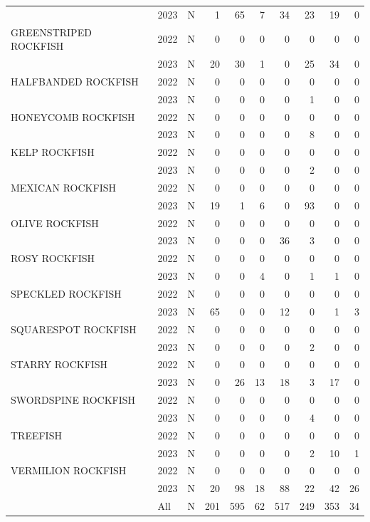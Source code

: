 \documentclass[
  letterpaper,
  DIV=11,
  numbers=noendperiod]{scrartcl}
\begin{document}
\begin{table}
\begin{tabular}[t]{lllrrrrrrr}
 & 2023 & N & 1 & 65 & 7 & 34 & 23 & 19 & 0\\
GREENSTRIPED ROCKFISH & 2022 & N & 0 & 0 & 0 & 0 & 0 & 0 & 0\\
 & 2023 & N & 20 & 30 & 1 & 0 & 25 & 34 & 0\\
HALFBANDED ROCKFISH & 2022 & N & 0 & 0 & 0 & 0 & 0 & 0 & 0\\
 & 2023 & N & 0 & 0 & 0 & 0 & 1 & 0 & 0\\
HONEYCOMB ROCKFISH & 2022 & N & 0 & 0 & 0 & 0 & 0 & 0 & 0\\
 & 2023 & N & 0 & 0 & 0 & 0 & 8 & 0 & 0\\
KELP ROCKFISH & 2022 & N & 0 & 0 & 0 & 0 & 0 & 0 & 0\\
 & 2023 & N & 0 & 0 & 0 & 0 & 2 & 0 & 0\\
MEXICAN ROCKFISH & 2022 & N & 0 & 0 & 0 & 0 & 0 & 0 & 0\\
 & 2023 & N & 19 & 1 & 6 & 0 & 93 & 0 & 0\\
OLIVE ROCKFISH & 2022 & N & 0 & 0 & 0 & 0 & 0 & 0 & 0\\
 & 2023 & N & 0 & 0 & 0 & 36 & 3 & 0 & 0\\
ROSY ROCKFISH & 2022 & N & 0 & 0 & 0 & 0 & 0 & 0 & 0\\
 & 2023 & N & 0 & 0 & 4 & 0 & 1 & 1 & 0\\
SPECKLED ROCKFISH & 2022 & N & 0 & 0 & 0 & 0 & 0 & 0 & 0\\
 & 2023 & N & 65 & 0 & 0 & 12 & 0 & 1 & 3\\
SQUARESPOT ROCKFISH & 2022 & N & 0 & 0 & 0 & 0 & 0 & 0 & 0\\
 & 2023 & N & 0 & 0 & 0 & 0 & 2 & 0 & 0\\
STARRY ROCKFISH & 2022 & N & 0 & 0 & 0 & 0 & 0 & 0 & 0\\
 & 2023 & N & 0 & 26 & 13 & 18 & 3 & 17 & 0\\
SWORDSPINE ROCKFISH & 2022 & N & 0 & 0 & 0 & 0 & 0 & 0 & 0\\
 & 2023 & N & 0 & 0 & 0 & 0 & 4 & 0 & 0\\
TREEFISH & 2022 & N & 0 & 0 & 0 & 0 & 0 & 0 & 0\\
 & 2023 & N & 0 & 0 & 0 & 0 & 2 & 10 & 1\\
VERMILION ROCKFISH & 2022 & N & 0 & 0 & 0 & 0 & 0 & 0 & 0\\
 & 2023 & N & 20 & 98 & 18 & 88 & 22 & 42 & 26\\
 & All & N & 201 & 595 & 62 & 517 & 249 & 353 & 34\\
\bottomrule
\end{tabular}
\end{table}
\end{document}

